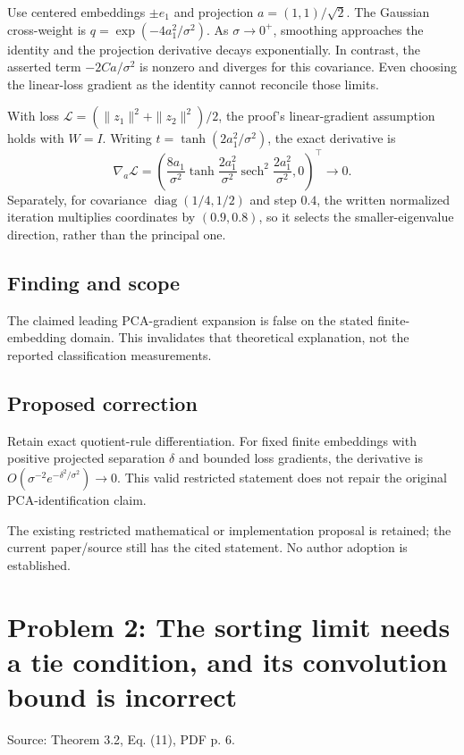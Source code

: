\documentclass[11pt]{article}
\begin{document}
Use centered embeddings \(\pm e_1\) and projection \(a=(1,1)/\sqrt2\). The Gaussian cross-weight is \(q=\exp(-4a_1^2/\sigma^2)\). As \(\sigma\to0^+\), smoothing approaches the identity and the projection derivative decays exponentially. In contrast, the asserted term \(-2Ca/\sigma^2\) is nonzero and diverges for this covariance. Even choosing the linear-loss gradient as the identity cannot reconcile those limits.

With loss \(\mathcal L=(\|z_1\|^2+\|z_2\|^2)/2\), the proof’s linear-gradient assumption holds with \(W=I\). Writing \(t=\tanh(2a_1^2/\sigma^2)\), the exact derivative is \[\nabla_a\mathcal L=\left(\frac{8a_1}{\sigma^2}\tanh\frac{2a_1^2}{\sigma^2}\operatorname{sech}^2\frac{2a_1^2}{\sigma^2},0\right)^\top\to0.\] Separately, for covariance \(\operatorname{diag}(1/4,1/2)\) and step \(0.4\), the written normalized iteration multiplies coordinates by \((0.9,0.8)\), so it selects the smaller-eigenvalue direction, rather than the principal one.

\subsection*{Finding and scope}

The claimed leading PCA-gradient expansion is false on the stated finite-embedding domain. This invalidates that theoretical explanation, not the reported classification measurements.

\subsection*{Proposed correction}

Retain exact quotient-rule differentiation. For fixed finite embeddings with positive projected separation \(\delta\) and bounded loss gradients, the derivative is \(O(\sigma^{-2}e^{-\delta^2/\sigma^2})\to0\). This valid restricted statement does not repair the original PCA-identification claim.

The existing restricted mathematical or implementation proposal is retained; the current paper/source still has the cited statement. No author adoption is established.

\section*{Problem 2: The sorting limit needs a tie condition, and its convolution bound is incorrect}

Source: Theorem 3.2, Eq. (11), PDF p. 6.
\end{document}
